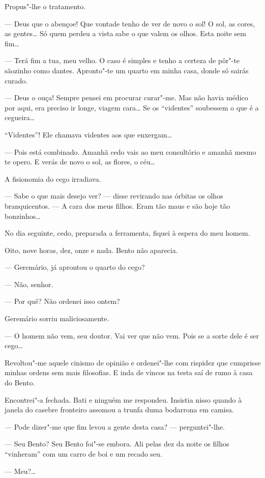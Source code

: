 Propus"-lhe o tratamento.

--- Deus que o abençoe! Que vontade tenho de ver de novo o sol! O sol,
as cores, as gentes\ldots{} Só quem perdeu a vista sabe o que valem os olhos.
Esta noite sem fim\ldots{}

--- Terá fim a tua, meu velho. O caso é simples e tenho a certeza de
pôr"-te sãozinho como dantes. Apronto"-te um quarto em minha casa, donde
só sairás curado.

--- Deus o ouça! Sempre pensei em procurar curar"-me. Mas não havia
médico por aqui, era preciso ir longe, viagem cara\ldots{} Se os ``videntes''
soubessem o que é a cegueira\ldots{}

``Videntes''! Ele chamava videntes aos que enxergam\ldots{}

--- Pois está combinado. Amanhã cedo vais ao meu consultório e amanhã
mesmo te opero. E verás de novo o sol, as flores, o céu\ldots{}

A fisionomia do cego irradiava.

--- Sabe o que mais desejo ver? --- disse revirando nas órbitas os olhos
branquicentos. --- A cara dos meus filhos. Eram tão maus e são hoje tão
bonzinhos\ldots{}

No dia seguinte, cedo, preparada a ferramenta, fiquei à espera do meu
homem.

Oito, nove horas, dez, onze e nada. Bento não aparecia.

--- Geremário, já aprontou o quarto do cego?

--- Não, senhor.

--- Por quê? Não ordenei isso ontem?

Geremário sorriu maliciosamente.

--- O homem não vem, seu doutor. Vai ver que não vem. Pois se a sorte
dele é ser cego\ldots{}

Revoltou"-me aquele cinismo de opinião e ordenei"-lhe com rispidez que
cumprisse minhas ordens sem mais filosofias. E inda de vincos na testa
saí de rumo à casa do Bento.

Encontrei"-a fechada. Bati e ninguém me respondeu. Insistia nisso quando
à janela do casebre fronteiro assomou a trunfa duma bodarrona em camisa.

--- Pode dizer"-me que fim levou a gente desta casa? --- perguntei"-lhe.

--- Seu Bento? Seu Bento foi"-se embora. Ali pelas dez da noite os filhos
``vinheram'' com um carro de boi e um recado seu.

--- Meu?\ldots{}

